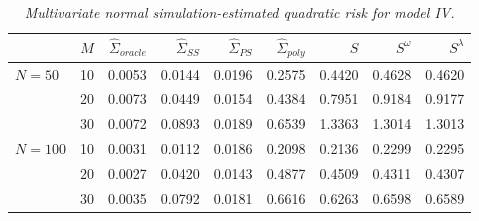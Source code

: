 %

\begin{table}[H]
\centering
\caption{\textit{Multivariate normal simulation-estimated quadratic risk  for model IV.} }
\begin{tabular}{lrrrrrrrr}
  & $M$ &$\hat{\Sigma}_{oracle}$ &$\hat{\Sigma}_{SS}$& $\hat{\Sigma}_{PS}$ & $\hat{\Sigma}_{poly}$ & $S$ &$S^\omega$& $S^\lambda$ \\ 
  \hline
$N = 50$ & 10 &0.0053 & 0.0144 & 0.0196 &  0.2575 & 0.4420 & 0.4628 & 0.4620 \\ 
  & $20$ & 0.0073 & 0.0449 & 0.0154 & 0.4384 & 0.7951 & 0.9184 & 0.9177 \\ 
  & $30$ & 0.0072 & 0.0893 & 0.0189 &  0.6539 & 1.3363 & 1.3014 & 1.3013 \\ 
 $N = 100$ & 10 &0.0031 & 0.0112 & 0.0186 &  0.2098 & 0.2136 & 0.2299 & 0.2295 \\ 
    &    $20$ &  0.0027 & 0.0420 & 0.0143 & 0.4877 & 0.4509 & 0.4311 & 0.4307 \\ 
    &    $30$ &0.0035 & 0.0792 & 0.0181 &  0.6616 & 0.6263 & 0.6598 & 0.6589 \\ 
   \hline
\end{tabular}
\label{table:simulation-1-quad-loss-sigma-4}
\end{table}

